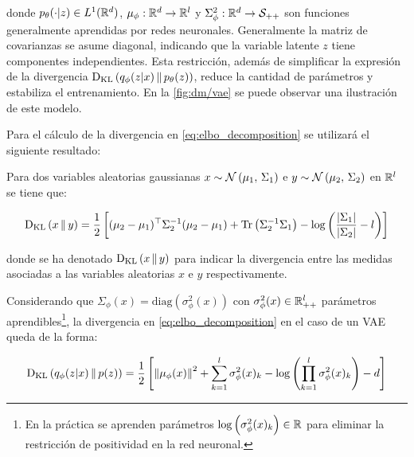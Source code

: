 donde $p_\theta(\cdot|z)\in L^1(\mathbb{R}^d)$, $\mu_\phi:\mathbb{R}^d\to\mathbb{R}^l$ y $\Sigma_\phi^2:\mathbb{R}^d\to\mathcal{S}_{++}$ son funciones generalmente aprendidas por redes neuronales. Generalmente la matriz de covarianzas se asume diagonal, indicando que la variable latente $z$ tiene componentes independientes. Esta restricción, además de simplificar la expresión de la divergencia $\operatorname{D_{KL}}\left(q_\phi(z|x)\,\|\,p_\theta(z)\right)$, reduce la cantidad de parámetros y estabiliza el entrenamiento. En la \autoref{fig:dm/vae} se puede observar una ilustración de este modelo.


Para el cálculo de la divergencia en \eqref{eq:elbo_decomposition} se utilizará el siguiente resultado:

\begin{teo}
    \label{teo:kl_gaussians}

    Para dos variables aleatorias gaussianas $x\sim\mathcal{N}\left(\mu_1,\,\Sigma_1\right)$ e $y\sim\mathcal{N}\left(\mu_2,\,\Sigma_2\right)$ en $\mathbb{R}^l$ se tiene que:

    \begin{equation}
        \operatorname{D_{KL}}\left(x\,\|\,y\right) = \frac{1}{2}\left[(\mu_2-\mu_1)^\top\Sigma_2^{-1}(\mu_2-\mu_1) + \operatorname{Tr}\left(\Sigma_2^{-1}\Sigma_1\right) - \log\left(\frac{|\Sigma_1|}{|\Sigma_2|}-l\right)\right]
    \end{equation}

    donde se ha denotado $\operatorname{D_{KL}}\left(x\,\|\,y\right)$ para indicar la divergencia entre las medidas asociadas a las variables aleatorias $x$ e $y$ respectivamente.

\end{teo}

Considerando que $\Sigma_\phi(x) = \text{diag}(\sigma_\phi^2(x))$ con $\sigma_\phi^2(x)\in\mathbb{R}^l_{++}$ parámetros aprendibles\footnote{En la práctica se aprenden parámetros $\log\left(\sigma_\phi^2(x)_k\right)\in\mathbb{R}$ para eliminar la restricción de positividad en la red neuronal.}, la divergencia en \eqref{eq:elbo_decomposition} en el caso de un VAE queda de la forma:

\begin{equation}
    \operatorname{D_{KL}}\left(q_\phi(z|x)\,\|\,p(z)\right)
    = \frac{1}{2}\left[
        \left\lVert \mu_\phi(x) \right\rVert^2 + \sum_{k=1}^l \sigma_\phi^2(x)_k
        - \log\left(\prod_{k=1}^l \sigma_\phi^2(x)_k\right)-d\right]
\end{equation}

